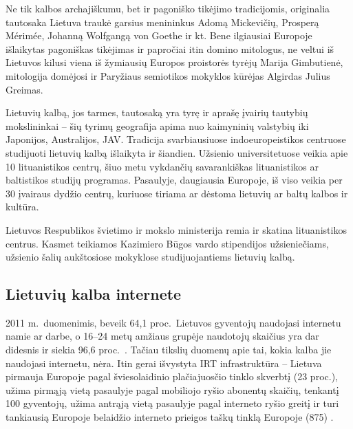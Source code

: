 \begin{multicols}{2}

 Ne tik kalbos archajiškumu, bet ir pagoniško tikėjimo tradicijomis, originalia tautosaka Lietuva traukė garsius menininkus Adomą Mickevičių, Prosperą Mérimée, Johanną Wolfgangą von Goethe ir kt. Bene ilgiausiai Europoje išlaikytas pagoniškas tikėjimas ir papročiai itin domino mitologus, ne veltui iš Lietuvos kilusi viena iš žymiausių Europos proistorės tyrėjų Marija Gimbutienė, mitologija domėjosi ir Paryžiaus semiotikos mokyklos kūrėjas Algirdas Julius Greimas.   

    Lietuvių kalbą, jos tarmes, tautosaką yra tyrę ir aprašę įvairių tautybių mokslininkai – šių tyrimų geografija apima nuo kaimyninių valstybių iki Japonijos, Australijos, JAV. Tradicija svarbiausiuose indoeuropeistikos centruose studijuoti lietuvių kalbą išlaikyta ir šiandien. Užsienio universitetuose veikia apie 10 lituanistikos centrų, šiuo metu vykdančių savarankiškas lituanistikos ar baltistikos studijų programas. Pasaulyje, daugiausia Europoje, iš viso veikia per 30 įvairaus dydžio centrų, kuriuose tiriama ar dėstoma lietuvių ar baltų kalbos ir kultūra.   


    Lietuvos Respublikos švietimo ir mokslo ministerija remia ir skatina lituanistikos centrus. Kasmet teikiamos Kazimiero Būgos vardo stipendijos užsieniečiams, užsienio šalių aukštosiose mokyklose studijuojantiems lietuvių kalbą.   

\subsection{Lietuvių kalba internete}

2011 m.~duomenimis, beveik 64,1 proc.~Lietuvos gyventojų naudojasi internetu namie ar darbe, o 16–24 metų amžiaus grupėje naudotojų skaičius yra dar didesnis ir siekia 96,6 proc.~\cite{stat}.  Tačiau tikslių duomenų apie tai, kokia kalba jie naudojasi internetu, nėra. Itin gerai išvystyta IRT infrastruktūra – Lietuva pirmauja Europoje pagal šviesolaidinio plačiajuosčio tinklo skverbtį (23 proc.), užima pirmąją vietą pasaulyje pagal mobiliojo ryšio abonentų skaičių, tenkantį 100 gyventojų, užima antrąją vietą pasaulyje pagal interneto ryšio greitį ir turi tankiausią Europoje belaidžio interneto prieigos taškų tinklą Europoje (875) \cite{invest}.


\end{multicols}
